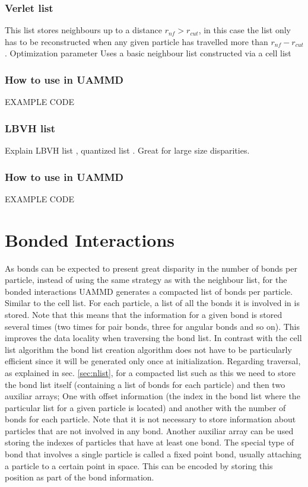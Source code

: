 \documentclass[ twoside,openright,titlepage,numbers=noenddot,%
headinclude,footinclude,cleardoublepage=empty,abstract=on,
BCOR=5mm,paper=a4,fontsize=11pt, dvipsnames
]{scrreprt}
\newcommand{\uammd}{\gls{UAMMD}\xspace}
\begin{document}
\subsubsection{Verlet list}

This list stores neighbours up to a distance $r_{nf} > r_{cut}$, in this case the list only has to be reconstructed when any given particle has travelled more than $r_{nf}-r_{cut}$.
Optimization parameter
Uses a basic neighbour list constructed via a cell list 


\subsubsection{How to use in UAMMD}

EXAMPLE CODE

\subsubsection{LBVH list}
Explain LBVH list \cite{lbvh}, quantized list \cite{quantizedlbvh}. Great for large size disparities.

\subsubsection{How to use in UAMMD}

EXAMPLE CODE

\section{Bonded Interactions}

As bonds can be expected to present great disparity in the number of bonds per particle, instead of using the same strategy as with the neighbour list, for the bonded interactions \uammd generates a compacted list of bonds per particle. Similar to the cell list.
For each particle, a list of all the bonds it is involved in is stored. Note that this means that the information for a given bond is stored several times (two times for pair bonds, three for angular bonds and so on).
This improves the data locality when traversing the bond list.
In contrast with the cell list algorithm the bond list creation algorithm does not have to be particularly efficient since it will be generated only once at initialization.
Regarding traversal, as explained in sec. \ref{sec:nlist}, for a compacted list such as this we need to store the bond list itself (containing a list of bonds for each particle) and then two auxiliar arrays; One with offset information (the index in the bond list where the particular list for a given particle is located) and another with the number of bonds for each particle.
Note that it is not necessary to store information about particles that are not involved in any bond. Another auxiliar array can be used storing the indexes of particles that have at least one bond.
The special type of bond that involves a single particle is called a fixed point bond, usually attaching a particle to a certain point in space. This can be encoded by storing this position as part of the bond information.
\end{document}

